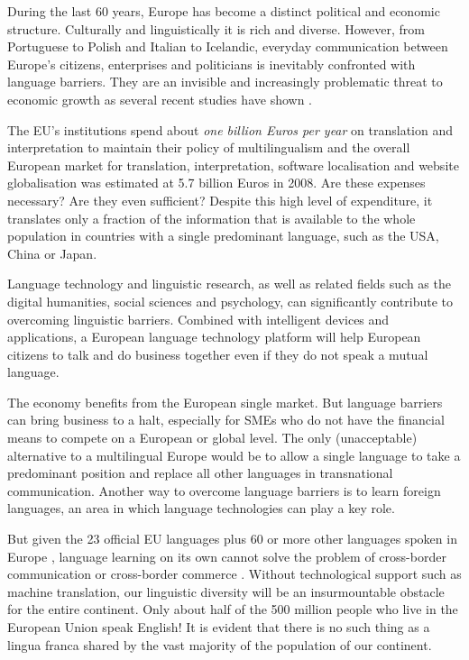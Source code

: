 \documentclass[10pt, plain]{../../metanetpaper}
\begin{document}
\begin{multicols}{2}
During the last 60 years, Europe has become a distinct political and economic structure. Culturally and linguistically it is rich and diverse. However, from Portuguese to Polish and Italian to Icelandic, everyday communication between Europe's citizens, enterprises and politicians is inevitably confronted with language barriers. They are an invisible and increasingly problematic threat to economic growth as several recent studies have shown \cite{economist12}.

The EU's institutions spend about \emph{one billion Euros per year} on translation and interpretation to maintain their policy of multilingualism \cite{EC7} and the overall European market for translation, interpretation, software localisation and website globalisation was estimated at 5.7 billion Euros in 2008. Are these expenses necessary? Are they even sufficient? Despite this high level of expenditure, it translates only a fraction of the information that is available to the whole population in countries with a single predominant language, such as the USA, China or Japan.

Language technology and linguistic research, as well as related fields such as the digital humanities, social sciences and psychology, can significantly contribute to overcoming linguistic barriers. Combined with intelligent devices and applications, a European language technology platform will help European citizens to talk and do business together even if they do not speak a mutual language.

The economy benefits from the European single market. But language barriers can bring business to a halt, especially for SMEs who do not have the financial means to compete on a European or global level. The only (unacceptable) alternative to a multilingual Europe \cite{lre2011} would be to allow a single language to take a predominant position and replace all other languages in transnational communication. Another way to overcome language barriers is to learn foreign languages, an area in which language technologies can play a key role.

But given the 23 official EU languages plus 60 or more other languages spoken in Europe \cite{eurobarometer2012}, language learning on its own cannot solve the problem of cross-border communication or cross-border commerce \cite{economist12}. Without technological support such as machine translation, our linguistic diversity will be an insurmountable obstacle for the entire continent. Only about half of the 500 million people who live in the European Union speak English! It is evident that there is no such thing as a lingua franca shared by the vast majority of the population of our continent.


\end{multicols}
\end{document}
